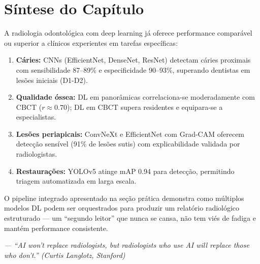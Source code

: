 \section{Síntese do Capítulo}
\label{sec:sintese-09}

A radiologia odontológica com deep learning já oferece performance comparável
ou superior a clínicos experientes em tarefas específicas:

\begin{enumerate}
  \item \textbf{Cáries:} CNNs (EfficientNet, DenseNet, ResNet) detectam cáries
        proximais com sensibilidade 87--89\% e especificidade 90--93\%, superando
        dentistas em lesões iniciais (D1-D2).
  \item \textbf{Qualidade óssea:} DL em panorâmicas correlaciona-se moderadamente
        com CBCT ($r \approx 0.70$); DL em CBCT supera residentes e equipara-se
        a especialistas.
  \item \textbf{Lesões periapicais:} ConvNeXt e EfficientNet com Grad-CAM
        oferecem detecção sensível (91\% de lesões sutis) com explicabilidade
        validada por radiologistas.
  \item \textbf{Restaurações:} YOLOv5 atinge mAP 0.94 para detecção, permitindo
        triagem automatizada em larga escala.
\end{enumerate}

O pipeline integrado apresentado na seção prática demonstra como múltiplos
modelos DL podem ser orquestrados para produzir um relatório radiológico
estruturado --- um ``segundo leitor'' que nunca se cansa, não tem viés de
fadiga e mantém performance consistente.

\begin{flushright}
\itshape\small
--- ``AI won't replace radiologists, but radiologists who use AI will replace
those who don't.'' (Curtis Langlotz, Stanford)
\end{flushright}

